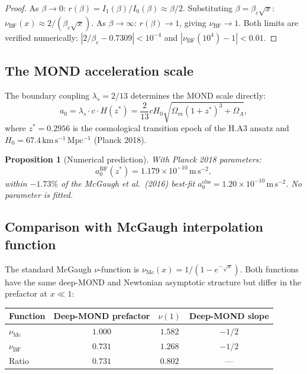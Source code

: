 \documentclass[12pt,a4paper]{article}
\theoremstyle{plain}
\newtheorem{proposition}[theorem]{Proposition}
\theoremstyle{definition}
\newcommand{\lams}{\lambda_s}
\newcommand{\betac}{\beta_c}
\newcommand{\nuBF}{\nu_{\mathrm{BF}}}
\newcommand{\nuMc}{\nu_{\mathrm{Mc}}}
\begin{document}
\begin{proof}
  As $\beta \to 0$: $r(\beta) = I_1(\beta)/I_0(\beta) \approx \beta/2$.
  Substituting $\beta = \betac\sqrt{x}$:
  $\nuBF(x) \approx 2/(\betac\sqrt{x})$.
  As $\beta \to \infty$: $r(\beta) \to 1$, giving $\nuBF \to 1$.
  Both limits are verified numerically: $|2/\betac - 0.7309| < 10^{-4}$
  and $|\nuBF(10^4) - 1| < 0.01$.
\end{proof}

\subsection{The MOND acceleration scale}

The boundary coupling $\lams = 2/13$ determines the MOND scale directly:
\begin{equation}
  a_0 = \lams \cdot c \cdot H(z^*) = \frac{2}{13} c H_0
  \sqrt{\Omega_m(1+z^*)^3 + \Omega_\Lambda},
\end{equation}
where $z^* = 0.2956$ is the cosmological transition epoch of the H.A3
ansatz and $H_0 = 67.4\,\mathrm{km\,s^{-1}\,Mpc^{-1}}$ (Planck 2018).

\begin{proposition}[Numerical prediction]
  With Planck 2018 parameters:
  \begin{equation}
    a_0^{\mathrm{BF}}(z^*) = 1.179 \times 10^{-10}\,\mathrm{m\,s^{-2}},
  \end{equation}
  within $-1.73\%$ of the McGaugh et al.\ (2016) best-fit
  $a_0^{\mathrm{obs}} = 1.20 \times 10^{-10}\,\mathrm{m\,s^{-2}}$.
  No parameter is fitted.
\end{proposition}

\subsection{Comparison with McGaugh interpolation function}

The standard McGaugh $\nu$-function is
$\nuMc(x) = 1/(1-e^{-\sqrt{x}})$.
Both functions have the same deep-MOND and Newtonian asymptotic structure
but differ in the prefactor at $x \ll 1$:

\begin{center}
\begin{tabular}{lccc}
\toprule
Function & Deep-MOND prefactor & $\nu(1)$ & Deep-MOND slope \\
\midrule
$\nuMc$ & $1.000$ & $1.582$ & $-1/2$ \\
$\nuBF$ & $0.731$ & $1.268$ & $-1/2$ \\
\midrule
Ratio   & $0.731$ & $0.802$ & — \\
\bottomrule
\end{tabular}
\end{center}
\end{document}
